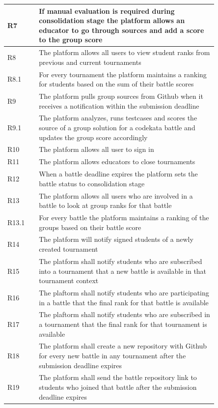 \begin{center}
\begin{longtable}{ |l|p{0.85\linewidth}| }
        \hline
            R7 & If manual evaluation is required during consolidation stage the platform allows an educator to go through sources and add a score to the group score \\
        \hline
            R8 & The platform allows all users to view student ranks from previous and current tournaments \\
        \hline
            R8.1 & For every tournament the platform maintains a ranking for students based on the sum of their battle scores \\
        \hline
            R9 & The platform pulls group sources from Github when it receives a notification within the submission deadline \\
        \hline
            R9.1 & The platform analyzes, runs testcases and scores the source of a group solution for a codekata battle and updates the group score accordingly \\
        \hline
            R10 & The platform allows all user to sign in \\
        \hline
            R11 & The platform allows educators to close tournaments  \\
        \hline
            R12 & When a battle deadline expires the platform sets the battle status to consolidation stage  \\
        \hline
            R13 & The platform allows all users who are involved in a battle to look at group ranks for that battle  \\
        \hline
            R13.1 & For every battle the platform maintains a ranking of the groups based on their battle score  \\
        \hline
            R14 & The platform will notify signed students of a newly created tournament  \\
        \hline
            R15 & The platform shall notify students who are subscribed into a tournament that a new battle is available in that tournament context  \\
        \hline
            R16 & The plaftorm shall notify students who are participating in a battle that the final rank for that battle is available  \\
        \hline
            R17 & The plaftorm shall notify students who are subscribed in a tournament that the final rank for that tournament is available  \\
        \hline
            R18 & The platform shall create a new repository with Github for every new battle in any tournament after the submission deadline expires\\
        \hline
            R19 & The platform shall send the battle repository link to students who joined that battle after the submission deadline expires\\
        \hline
    \end{longtable}
\end{center}
